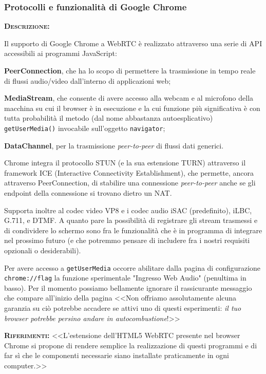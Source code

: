 \subsubsection{Protocolli e funzionalità di Google Chrome}
\begin{description}
	\item{\scshape\bfseries Descrizione:}
  
Il supporto di Google Chrome a WebRTC è realizzato attraverso una serie di API accessibili ai programmi JavaScript:
\begin{description}
\item{\bfseries PeerConnection}, che ha lo scopo di permettere la trasmissione in tempo reale di flussi audio/video dall'interno di applicazioni web;
\item{\bfseries MediaStream}, che consente di avere accesso alla webcam e al microfono della macchina su cui il browser è in esecuzione e la cui funzione più significativa è con tutta probabilità il metodo (dal nome abbastanza autoesplicativo) \texttt{getUserMedia()} invocabile sull'oggetto \texttt{navigator};
\item{\bfseries DataChannel}, per la trasmissione \textit{peer-to-peer} di flussi dati generici.
\end{description}

Chrome integra il protocollo STUN (e la sua estensione TURN) attraverso il framework ICE (Interactive Connectivity Establishment), che permette, ancora attraverso PeerConnection, di stabilire una connessione \textit{peer-to-peer} anche se gli endpoint della connessione si trovano dietro un NAT\@. 

Supporta inoltre al codec video VP8 e i codec audio iSAC (predefinito), iLBC, G.711, e DTMF\@. A quanto pare la possibilità di registrare gli stream trasmessi e di condividere lo schermo sono fra le funzionalità che è in programma di integrare nel prossimo futuro (e che potremmo pensare di includere fra i nostri requisiti opzionali o desiderabili).

Per avere accesso a \texttt{getUserMedia} occorre abilitare dalla pagina di configurazione \texttt{chrome://flag} la funzione sperimentale "Ingresso Web Audio" (penultima in basso). Per il momento possiamo bellamente ignorare il rassicurante messaggio che compare all'inizio della pagina <<Non offriamo assolutamente alcuna garanzia su ciò potrebbe accadere se attivi uno di questi esperimenti: \textit{il tuo browser potrebbe persino andare in autocombustione}!>>
	\item{\scshape\bfseries Riferimenti:}
  <<L'estensione dell'HTML5 WebRTC presente nel browser Chrome si propone di rendere semplice la realizzazione di questi programmi e di far sì che le
componenti necessarie siano installate praticamente in ogni computer.>>


\end{description}
